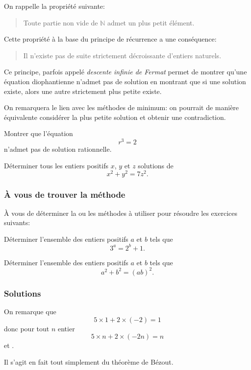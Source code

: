 On rappelle la propriété suivante:
\begin{quote}
  Toute partie non vide de $\mathbb{N}$ admet un plus petit élément.
\end{quote}

Cette propriété à la base du principe de récurrence a une conséquence:
\begin{quote}
  Il n'existe pas de suite strictement décroissante d'entiers naturels.
\end{quote}

Ce principe, parfois appelé \emph{descente infinie de Fermat} permet de montrer qu'une équation diophantienne n'admet pas de solution en montrant que si une solution existe, alors une autre strictement plus petite existe.

On remarquera le lien avec les méthodes de minimum: on pourrait de manière équivalente considérer la plus petite solution et obtenir une contradiction.

\begin{exo}
  Montrer que l'équation
  \[r^3 = 2\]
  n'admet pas de solution rationnelle.
\end{exo}

\begin{exo}[Bac 2003]
  Déterminer tous les entiers positifs $x$, $y$ et $z$ solutions de
  \[x^2 + y^2 = 7 z^2.\]
\end{exo}

\subsubsection{À vous de trouver la méthode}

À vous de déterminer la ou les méthodes à utiliser pour résoudre les exercices suivants:

\begin{exo}
  Déterminer l'ensemble des entiers positifs $a$ et $b$ tels que
  \[3^a = 2^b +1.\]
\end{exo}

\begin{exo}
  Déterminer l'ensemble des entiers positifs $a$ et $b$ tels que
  \[a^2 + b^2 = (ab)^2.\]
\end{exo}

\subsubsection{Solutions}

\begin{sol}
  On remarque que
  \[5 \times 1 + 2 \times (-2) = 1\]
  donc pour tout $n$ entier
  \[5 \times n + 2 \times (-2n) = n\]
  et .


  Il s'agit en fait tout simplement du théorème de Bézout.
\end{sol}

